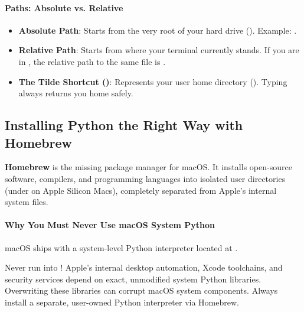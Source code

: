 \paragraph{Paths: Absolute vs. Relative}
\begin{itemize}
    \item \textbf{Absolute Path}: Starts from the very root of your hard drive (\code{/}). Example: .
    \item \textbf{Relative Path}: Starts from where your terminal currently stands. If you are in , the relative path to the same file is .
    \item \textbf{The Tilde Shortcut (\code{\~})}: Represents your user home directory (). Typing  always returns you home safely.
\end{itemize}

\subsection{Installing Python the Right Way with Homebrew}

\begin{keyidea}
\textbf{Homebrew} is the missing package manager for macOS. It installs open-source software, compilers, and programming languages into isolated user directories (under  on Apple Silicon Macs), completely separated from Apple's internal system files.
\end{keyidea}

\paragraph{Why You Must Never Use macOS System Python}
macOS ships with a system-level Python interpreter located at . 
\begin{warning}
Never run  into ! Apple's internal desktop automation, Xcode toolchains, and security services depend on exact, unmodified system Python libraries. Overwriting these libraries can corrupt macOS system components. Always install a separate, user-owned Python interpreter via Homebrew.
\end{warning}

